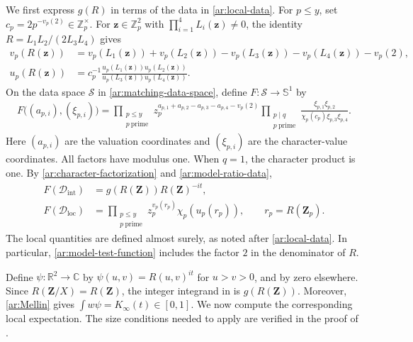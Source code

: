 \documentclass[twoside]{aomart}
\theoremstyle{paperplain}
\theoremstyle{paperdefinition}
\newcommand{\Z}{\mathbb Z}
\newcommand{\R}{\mathbb R}
\newcommand{\C}{\mathbb C}
\numberwithin{equation}{section}
\begin{document}
We first express $g(R)$ in terms of the data in \eqref{ar:local-data}.
For $p\le y$, set $c_p=2p^{-v_p(2)}\in\Z_p^\times$.
For $\mathbf z\in\Z_p^2$ with $\displaystyle\prod_{i=1}^4L_i(\mathbf z)\ne0$,
the identity $R=L_1L_2/(2L_3L_4)$ gives
\begin{equation}
 \begin{aligned}
 v_p(R(\mathbf z))
 &=v_p(L_1(\mathbf z))+v_p(L_2(\mathbf z))
   -v_p(L_3(\mathbf z))-v_p(L_4(\mathbf z))-v_p(2),\\
 u_p(R(\mathbf z))
 &=c_p^{-1}
   \frac{u_p(L_1(\mathbf z))u_p(L_2(\mathbf z))}
        {u_p(L_3(\mathbf z))u_p(L_4(\mathbf z))}.
 \end{aligned}
 \label{ar:model-ratio-data}
\end{equation}
On the data space $\mathscr S$ in \eqref{ar:matching-data-space}, define
$F:\mathscr S\to\mathbb S^1$ by
\begin{equation}
 \begin{aligned}
 F\bigl((a_{p,i}),(\xi_{p,i})\bigr)
 ={}\prod_{\substack{p\le y\\p\ \mathrm{prime}}}
 z_p^{a_{p,1}+a_{p,2}-a_{p,3}-a_{p,4}-v_p(2)}
 \prod_{\substack{p\mid q\\p\ \mathrm{prime}}}
 \frac{\xi_{p,1}\xi_{p,2}}
      {\chi_p(c_p)\xi_{p,3}\xi_{p,4}}.
 \end{aligned}
 \label{ar:model-test-function}
\end{equation}
Here $(a_{p,i})$ are the valuation coordinates and $(\xi_{p,i})$
are the character-value coordinates. All factors have modulus one.
When $q=1$, the character product is one.
By \eqref{ar:character-factorization} and \eqref{ar:model-ratio-data},
\begin{equation}
 \begin{aligned}
 F(\mathcal D_{\mathrm{int}})
 &=g(R(\mathbf Z))R(\mathbf Z)^{-it},\\
 F(\mathcal D_{\mathrm{loc}})
 &=\prod_{\substack{p\le y\\p\ \mathrm{prime}}}z_p^{v_p(r_p)}\chi_p(u_p(r_p)),
 \qquad r_p=R(\mathbf Z_p).
 \end{aligned}
 \label{ar:model-data-identities}
\end{equation}
The local quantities are defined almost surely, as noted after
\eqref{ar:local-data}. In particular, \eqref{ar:model-test-function}
includes the factor $2$ in the denominator of $R$.

Define $\psi:\R^2\to\C$ by $\psi(u,v)=R(u,v)^{it}$ for $u>v>0$,
and by zero elsewhere. Since $R(\mathbf Z/X)=R(\mathbf Z)$,
the integer integrand in  is $g(R(\mathbf Z))$.
Moreover, \eqref{ar:Mellin} gives $\displaystyle \int w\psi=K_\infty(t)\in[0,1]$.
We now compute the corresponding local expectation.
The size conditions needed to apply  are verified
in the proof of .
\end{document}
